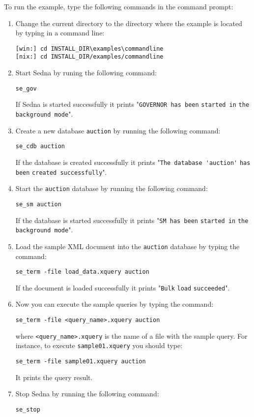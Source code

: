 \documentclass[a4paper,12pt]{article}
\begin{document}
To run the example, type the following commands in the command prompt:
\begin{enumerate}
\item Change the current directory to the directory where the example is located
by typing in a command line:
\begin{verbatim}
[win:] cd INSTALL_DIR\examples\commandline
[nix:] cd INSTALL_DIR/examples/commandline
\end{verbatim}

\item Start Sedna by runing the following command:
\begin{verbatim}
se_gov
\end{verbatim}
If Sedna is started successfully it prints "\verb!GOVERNOR has been!
\verb!started in! \verb!the background mode!".

\item Create a new database \verb!auction! by running the following command:
\begin{verbatim}
se_cdb auction
\end{verbatim}
If the database is created successfully it prints "\verb!The database 'auction'!
\verb!has been! \verb!created successfully!".

\item Start the \verb!auction! database by running the following command:
\begin{verbatim}
se_sm auction
\end{verbatim}
If the database is started successfully it prints "\verb!SM has been!
\verb!started in! \verb!the background mode!".

\item Load the sample XML document into the \verb!auction! database by typing
the command:
\begin{verbatim}
se_term -file load_data.xquery auction
\end{verbatim}
If the document is loaded successfully it prints "\verb!Bulk! \verb!load!
\verb!succeeded!".

\item Now you can execute the sample queries by typing the command:
\begin{verbatim}
se_term -file <query_name>.xquery auction
\end{verbatim}
where \verb!<query_name>.xquery! is the name of a file with the sample query.
For instance, to execute \verb!sample01.xquery! you should type:
\begin{verbatim}
se_term -file sample01.xquery auction
\end{verbatim}
It prints the query result.

\item Stop Sedna by running the following command:
\begin{verbatim}
se_stop
\end{verbatim}
\end{enumerate}
\end{document}
